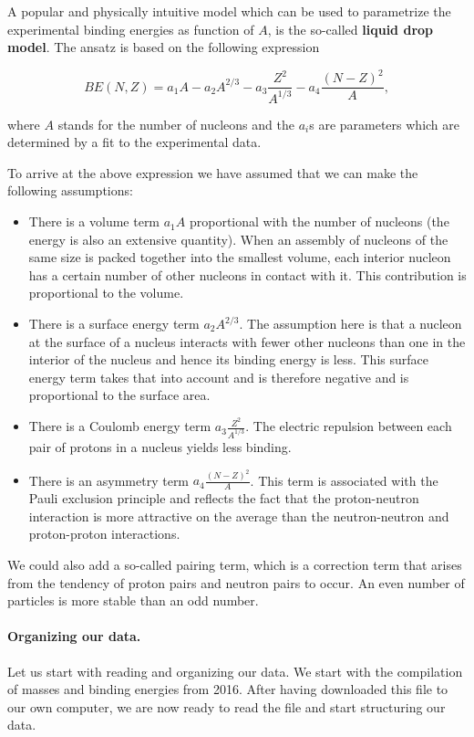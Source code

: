 \documentclass[%
oneside,                 %
final,                   %
10pt]{article}
\begin{document}
A popular and physically intuitive model which can be used to parametrize 
the experimental binding energies as function of $A$, is the so-called 
\textbf{liquid drop model}. The ansatz is based on the following expression

\[ 
BE(N,Z) = a_1A-a_2A^{2/3}-a_3\frac{Z^2}{A^{1/3}}-a_4\frac{(N-Z)^2}{A},
\]

where $A$ stands for the number of nucleons and the $a_i$s are parameters which are determined by a fit 
to the experimental data.  




To arrive at the above expression we have assumed that we can make the following assumptions:

\begin{itemize}
 \item There is a volume term $a_1A$ proportional with the number of nucleons (the energy is also an extensive quantity). When an assembly of nucleons of the same size is packed together into the smallest volume, each interior nucleon has a certain number of other nucleons in contact with it. This contribution is proportional to the volume.

 \item There is a surface energy term $a_2A^{2/3}$. The assumption here is that a nucleon at the surface of a nucleus interacts with fewer other nucleons than one in the interior of the nucleus and hence its binding energy is less. This surface energy term takes that into account and is therefore negative and is proportional to the surface area.

 \item There is a Coulomb energy term $a_3\frac{Z^2}{A^{1/3}}$. The electric repulsion between each pair of protons in a nucleus yields less binding. 

 \item There is an asymmetry term $a_4\frac{(N-Z)^2}{A}$. This term is associated with the Pauli exclusion principle and reflects the fact that the proton-neutron interaction is more attractive on the average than the neutron-neutron and proton-proton interactions.
\end{itemize}

\noindent
We could also add a so-called pairing term, which is a correction term that
arises from the tendency of proton pairs and neutron pairs to
occur. An even number of particles is more stable than an odd number. 


\paragraph{Organizing our data.}
Let us start with reading and organizing our data. 
We start with the compilation of masses and binding energies from 2016.
After having downloaded this file to our own computer, we are now ready to read the file and start structuring our data.
\end{document}
